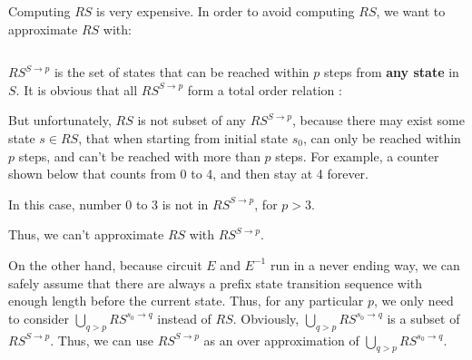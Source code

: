 \documentclass[journal]{IEEEtran}
\begin{document}
Computing $RS$ is very expensive.
In order to avoid computing $RS$,
we want to approximate $RS$ with:

\begin{equation}\label{apprse}
\end{equation}

$RS^{S\to p}$ is the set of states that can be reached within $p$ steps from \textbf{any state} in $S$.
It is obvious that all $RS^{S\to p}$ form a total order relation :
\begin{displaymath}
\end{displaymath}
%


But unfortunately,
$RS$ is not subset of any $RS^{S\to p}$,
because there may exist some state $s\in RS$,
that when starting from initial state $s_0$,
can only be reached within $p$ steps,
and can't be reached with more than $p$ steps.
For example,
a counter shown below that counts from 0 to 4,
and then stay at 4 forever.
\begin{displaymath}
\end{displaymath}


In this case,
number 0 to 3 is not in $RS^{S\to p}$,
for $p>3$.

Thus,
we can't approximate $RS$ with $RS^{S\to p}$.

On the other hand,
because circuit $E$ and $E^{-1}$ run in a never ending way,
we can safely assume that there are always a prefix state transition sequence with enough length before the current state.
Thus,
for any particular $p$,
we only need to consider $\bigcup_{q>p}RS^{s_0\to q}$ instead of $RS$.
Obviously,
$\bigcup_{q>p}RS^{s_0\to q}$ is a subset of $RS^{S\to p}$.
Thus,
we can use $RS^{S\to p}$ as an over approximation of $\bigcup_{q>p}RS^{s_0\to q}$.
\end{document}
